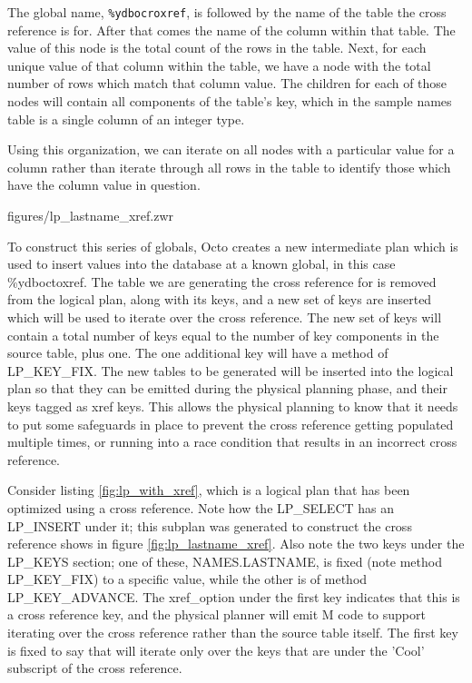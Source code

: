 \documentclass[]{article}
\def\code#1{\texttt{#1}}
\begin{document}
The global name, \code{\%ydbocroxref}, is followed by the name of the table the cross reference is for.
After that comes the name of the column within that table.
The value of this node is the total count of the rows in the table.
Next, for each unique value of that column within the table, we have a node with the total number of rows which match that column value.
The children for each of those nodes will contain all components of the table's key, which in the sample names table is a single column of an integer type.

Using this organization, we can iterate on all nodes with a particular value for a column rather than iterate through all rows in the table to identify those which have the column value in question.


{figures/lp_lastname_xref.zwr}

To construct this series of globals, Octo creates a new intermediate plan which is used to insert values into the database at a known global, in this case \%ydboctoxref.
The table we are generating the cross reference for is removed from the logical plan, along with its keys, and a new set of keys are inserted which will be used to iterate over the cross reference.
The new set of keys will contain a total number of keys equal to the number of key components in the source table, plus one.
The one additional key will have a method of LP\_KEY\_FIX.
The new tables to be generated will be inserted into the logical plan so that they can be emitted during the physical planning phase, and their keys tagged as xref keys.
This allows the physical planning to know that it needs to put some safeguards in place to prevent the cross reference getting populated multiple times, or running into a race condition that results in an incorrect cross reference.

Consider listing \ref{fig:lp_with_xref}, which is a logical plan that has been optimized using a cross reference.
Note how the LP\_SELECT has an LP\_INSERT under it; this subplan was generated to construct the cross reference shows in figure \ref{fig:lp_lastname_xref}.
Also note the two keys under the LP\_KEYS section; one of these, NAMES.LASTNAME, is fixed (note method LP\_KEY\_FIX) to a specific value, while the other is of method LP\_KEY\_ADVANCE.
The xref\_option under the first key indicates that this is a cross reference key, and the physical planner will emit M code to support iterating over the cross reference rather than the source table itself.
The first key is fixed to say that will iterate only over the keys that are under the 'Cool' subscript of the cross reference.
\end{document}
